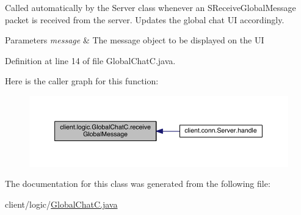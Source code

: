 Called automatically by the {\ttfamily Server} class whenever an {\ttfamily S\+Receive\+Global\+Message} packet is received from the server. Updates the global chat UI accordingly.


\begin{DoxyParams}{Parameters}
{\em message} & The message object to be displayed on the UI \\
\hline
\end{DoxyParams}


Definition at line 14 of file Global\+Chat\+C.\+java.

Here is the caller graph for this function\+:
\nopagebreak
\begin{figure}[H]
\begin{center}
\leavevmode
\includegraphics[width=350pt]{classclient_1_1logic_1_1_global_chat_c_a74158167fb483ea7cec74151a49734cb_icgraph}
\end{center}
\end{figure}


The documentation for this class was generated from the following file\+:\begin{DoxyCompactItemize}
\item 
client/logic/\hyperlink{_global_chat_c_8java}{Global\+Chat\+C.\+java}\end{DoxyCompactItemize}
